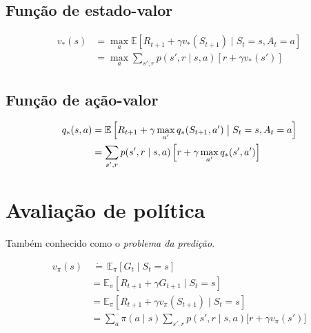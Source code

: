 \documentclass{article}
\begin{document}
        \subsection{Função de estado-valor}
        
            \begin{equation}
                \begin{split}
                    v_*(s) & = \max_a \mathbb{E} \left[ R_{t+1} + \gamma v_*(S_{t+1}) \mid S_t = s, A_t = a \right] \\
                    & = \max_a \sum_{s', r} p(s',r \mid s,a) \left[ r + \gamma v_*(s') \right]
                \end{split}
            \end{equation}
        
        \subsection{Função de ação-valor}
    
            \begin{equation}
                \begin{split}
                    q_*(s,a) & = \mathbb{E} \left[ R_{t+1} + \gamma \max_{a'} q_*(S_{t+1}, a') \bigm\vert S_t = s, A_t = a \right] \\
                    & = \sum_{s', r} p(s',r \mid s,a) \left[ r + \gamma \max_{a'}q_*(s', a') \right]
                \end{split}
            \end{equation}
            
    \section{Avaliação de política}
    
        Também conhecido como o \textit{problema da predição}.
        
        \begin{equation}
            \begin{split}
                v_{\pi}(s) & \ \dot{=} \, \mathbb{E}_{\pi} \left[ G_t \mid S_t = s \right] \\
                & = \mathbb{E}_{\pi} \left[ R_{t+1} + \gamma G_{t+1} \mid S_t = s \right] \\
                & = \mathbb{E}_{\pi} \left[ R_{t+1} + \gamma v_{\pi}(S_{t+1}) \mid S_t = s \right] \\
                & = \sum_a \pi(a \mid s) \sum_{s',r} p(s',r \mid s,a) \Big[ r + \gamma v_{\pi}(s') \Big]
            \end{split}
        \end{equation}
        
\end{document}
